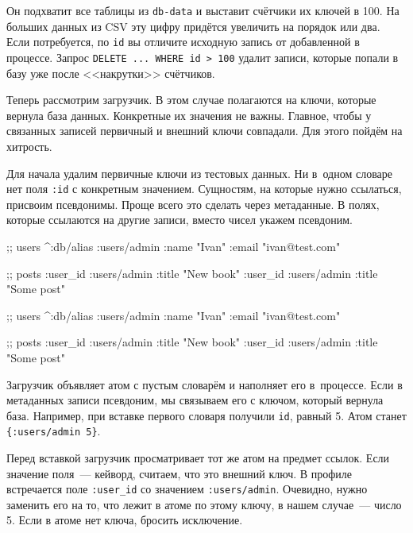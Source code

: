 \fi

Он подхватит все таблицы из \verb|db-data| и выставит счётчики их ключей в
100. На больших данных из CSV эту цифру придётся увеличить на порядок или
два. Если потребуется, по \verb|id| вы отличите исходную запись от добавленной в
процессе. Запрос \verb|DELETE ... WHERE id > 100| удалит записи, которые попали
в базу уже после <<накрутки>> счётчиков.

Теперь рассмотрим загрузчик. В этом случае полагаются на ключи, которые вернула
база данных. Конкретные их значения не важны. Главное, чтобы у связанных записей
первичный и внешний ключи совпадали. Для этого пойдём на хитрость.

Для начала удалим первичные ключи из тестовых данных. Ни в~одном словаре нет
поля \verb|:id| с конкретным значением. Сущностям, на которые нужно ссылаться,
присвоим псевдонимы. Проще всего это сделать через метаданные. В полях, которые
ссылаются на другие записи, вместо чисел укажем псевдоним.


\ifnarrow

\begin{english}
  \begin{clojure}
;; users
^{:db/alias :users/admin}
 {:name "Ivan" :email "ivan@test.com"}

;; posts
{:user_id :users/admin
 :title "New book"}
{:user_id :users/admin
 :title "Some post"}
  \end{clojure}
\end{english}

\else

\begin{english}
  \begin{clojure}
;; users
^{:db/alias :users/admin}
 {:name "Ivan" :email "ivan@test.com"}

;; posts
{:user_id :users/admin :title "New book"}
{:user_id :users/admin :title "Some post"}
  \end{clojure}
\end{english}

\fi

Загрузчик объявляет атом с пустым словарём и наполняет его в~процессе. Если в
метаданных записи псевдоним, мы связываем его с ключом, который вернула
база. Например, при вставке первого словаря получили \verb|id|, равный 5. Атом
станет \verb|{:users/admin 5}|.

Перед вставкой загрузчик просматривает тот же атом на предмет ссылок. Если
значение поля~--- кейворд, считаем, что это внешний ключ. В профиле встречается
поле \verb|:user_id| со значением \verb|:users/admin|. Очевидно, нужно заменить
его на то, что лежит в атоме по этому ключу, в нашем случае~--- число 5. Если в
атоме нет ключа, бросить исключение.


